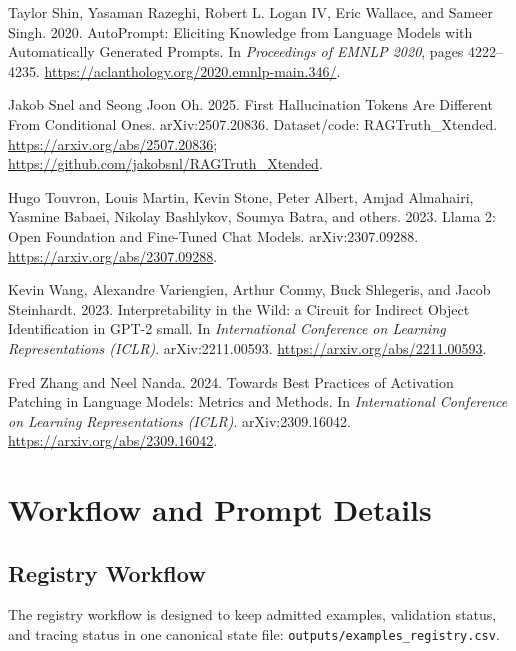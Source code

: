 \documentclass[11pt]{article}
\begin{document}
\begin{thebibliography}{}
Taylor Shin, Yasaman Razeghi, Robert L. Logan IV, Eric Wallace, and Sameer Singh.
2020.
\newblock AutoPrompt: Eliciting Knowledge from Language Models with Automatically Generated Prompts.
\newblock In \emph{Proceedings of EMNLP 2020}, pages 4222--4235.
\newblock \url{https://aclanthology.org/2020.emnlp-main.346/}.

Jakob Snel and Seong Joon Oh. 2025.
\newblock First Hallucination Tokens Are Different From Conditional Ones.
\newblock arXiv:2507.20836. Dataset/code: RAGTruth\_Xtended.
\newblock \url{https://arxiv.org/abs/2507.20836}; \url{https://github.com/jakobsnl/RAGTruth_Xtended}.

Hugo Touvron, Louis Martin, Kevin Stone, Peter Albert, Amjad Almahairi, Yasmine Babaei, Nikolay Bashlykov, Soumya Batra, and others.
2023.
\newblock Llama 2: Open Foundation and Fine-Tuned Chat Models.
\newblock arXiv:2307.09288.
\newblock \url{https://arxiv.org/abs/2307.09288}.

Kevin Wang, Alexandre Variengien, Arthur Conmy, Buck Shlegeris, and Jacob Steinhardt.
2023.
\newblock Interpretability in the Wild: a Circuit for Indirect Object Identification in GPT-2 small.
\newblock In \emph{International Conference on Learning Representations (ICLR)}. arXiv:2211.00593.
\newblock \url{https://arxiv.org/abs/2211.00593}.

Fred Zhang and Neel Nanda. 2024.
\newblock Towards Best Practices of Activation Patching in Language Models: Metrics and Methods.
\newblock In \emph{International Conference on Learning Representations (ICLR)}. arXiv:2309.16042.
\newblock \url{https://arxiv.org/abs/2309.16042}.

\end{thebibliography}

\appendix

\section{Workflow and Prompt Details}
\subsection{Registry Workflow}
\label{app:registry}

The registry workflow is designed to keep admitted examples, validation status, and tracing status in one canonical state file: \texttt{outputs/examples\_registry.csv}.
\end{document}
